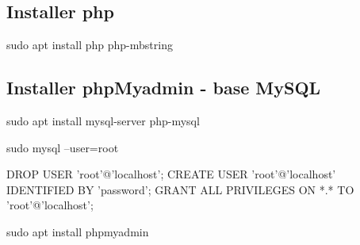 \documentclass[20pt]{article}
\begin{document}
\subsection{Installer php}

sudo apt install php php-mbstring

\subsection{Installer phpMyadmin - base MySQL}

sudo apt install mysql-server php-mysql

sudo mysql --user=root


DROP USER 'root'@'localhost';
CREATE USER 'root'@'localhost' IDENTIFIED BY 'password';
GRANT ALL PRIVILEGES ON *.* TO 'root'@'localhost';

sudo apt install phpmyadmin

 
\end{document}
